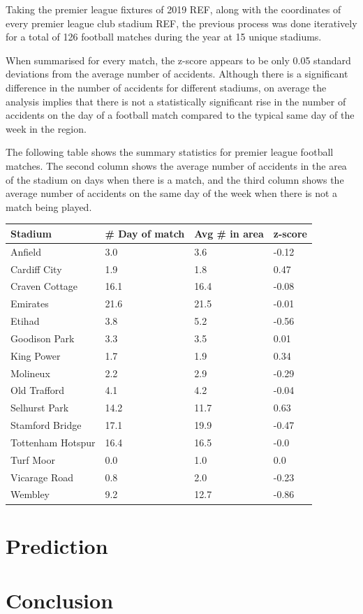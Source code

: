 \documentclass[12pt]{article}
\begin{document}
Taking the premier league fixtures of 2019 REF, along with the coordinates of every premier league club stadium REF, the previous process was done iteratively for a total of 126 football matches during the year at 15 unique stadiums.

When summarised for every match, the z-score appears to be only 0.05 standard deviations from the average number of accidents. Although there is a significant difference in the number of accidents for different stadiums, on average the analysis implies that there is not a statistically significant rise in the number of accidents on the day of a football match compared to the typical same day of the week in the region.

The following table shows the summary statistics for premier league football matches. The second column shows the average number of accidents in the area of the stadium on days when there is a match, and the third column shows the average number of accidents on the same day of the week when there is not a match being played.

\begin{table}[!ht]
    \centering
    \begin{tabular}{|l|l|l|l|}
    \hline
        Stadium & \# Day of match & Avg \# in area & z-score \\ \hline
        Anfield & 3.0 & 3.6 & -0.12 \\ \hline
        Cardiff City & 1.9 & 1.8 & 0.47 \\ \hline
        Craven Cottage & 16.1 & 16.4 & -0.08 \\ \hline
        Emirates & 21.6 & 21.5 & -0.01 \\ \hline
        Etihad & 3.8 & 5.2 & -0.56 \\ \hline
        Goodison Park & 3.3 & 3.5 & 0.01 \\ \hline
        King Power & 1.7 & 1.9 & 0.34 \\ \hline
        Molineux & 2.2 & 2.9 & -0.29 \\ \hline
        Old Trafford & 4.1 & 4.2 & -0.04 \\ \hline
        Selhurst Park & 14.2 & 11.7 & 0.63 \\ \hline
        Stamford Bridge & 17.1 & 19.9 & -0.47 \\ \hline
        Tottenham Hotspur & 16.4 & 16.5 & -0.0 \\ \hline
        Turf Moor & 0.0 & 1.0 & 0.0 \\ \hline
        Vicarage Road & 0.8 & 2.0 & -0.23 \\ \hline
        Wembley & 9.2 & 12.7 & -0.86 \\ \hline
    \end{tabular}
\end{table}

\section{Prediction}

\section{Conclusion}



\end{document}

